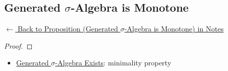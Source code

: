 
\subsection*{Generated $\sigma$-Algebra is Monotone}
\label{prf:generated-sigma-monotone}

\begin{remark*}[Return]
\hyperref[prop:generated-sigma-monotone]{$\leftarrow$ Back to Proposition (Generated $\sigma$-Algebra is Monotone) in Notes}
\end{remark*}

\begin{proof}
\end{proof}

\begin{remark*}

\end{remark*}

\begin{remark*}[Dependencies]
\begin{itemize}
  \item \hyperref[prop:generated-sigma-exists]{Generated $\sigma$-Algebra Exists}: minimality property
\end{itemize}

\end{remark*}
